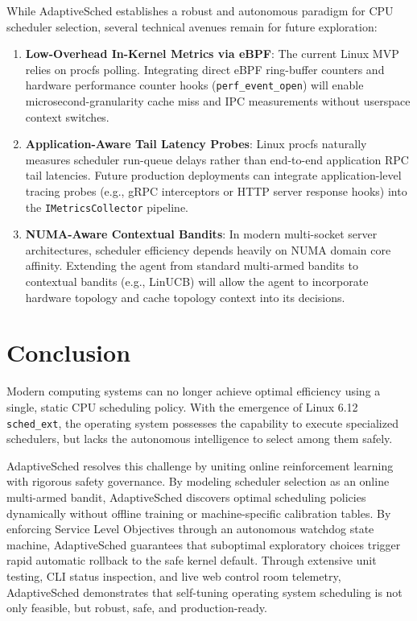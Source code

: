 \documentclass[journal]{IEEEtran}
\begin{document}
While AdaptiveSched establishes a robust and autonomous paradigm for CPU scheduler selection, several technical avenues remain for future exploration:
\begin{enumerate}
    \item \textbf{Low-Overhead In-Kernel Metrics via eBPF}: The current Linux MVP relies on procfs polling. Integrating direct eBPF ring-buffer counters and hardware performance counter hooks (\texttt{perf\_event\_open}) will enable microsecond-granularity cache miss and IPC measurements without userspace context switches.
    \item \textbf{Application-Aware Tail Latency Probes}: Linux procfs naturally measures scheduler run-queue delays rather than end-to-end application RPC tail latencies. Future production deployments can integrate application-level tracing probes (e.g., gRPC interceptors or HTTP server response hooks) into the \texttt{IMetricsCollector} pipeline.
    \item \textbf{NUMA-Aware Contextual Bandits}: In modern multi-socket server architectures, scheduler efficiency depends heavily on NUMA domain core affinity. Extending the agent from standard multi-armed bandits to contextual bandits (e.g., LinUCB) will allow the agent to incorporate hardware topology and cache topology context into its decisions.
\end{enumerate}

\section{Conclusion}
\label{sec:conclusion}

Modern computing systems can no longer achieve optimal efficiency using a single, static CPU scheduling policy. With the emergence of Linux 6.12 \texttt{sched\_ext}, the operating system possesses the capability to execute specialized schedulers, but lacks the autonomous intelligence to select among them safely.

AdaptiveSched resolves this challenge by uniting online reinforcement learning with rigorous safety governance. By modeling scheduler selection as an online multi-armed bandit, AdaptiveSched discovers optimal scheduling policies dynamically without offline training or machine-specific calibration tables. By enforcing Service Level Objectives through an autonomous watchdog state machine, AdaptiveSched guarantees that suboptimal exploratory choices trigger rapid automatic rollback to the safe kernel default. Through extensive unit testing, CLI status inspection, and live web control room telemetry, AdaptiveSched demonstrates that self-tuning operating system scheduling is not only feasible, but robust, safe, and production-ready.
\end{document}
